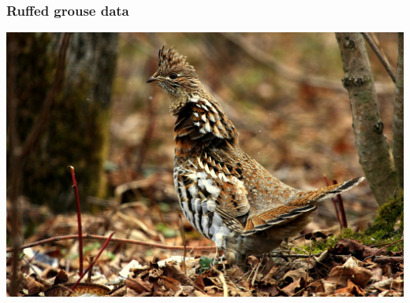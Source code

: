 \documentclass[color=usenames,dvipsnames]{beamer}\usepackage[]{graphicx}\usepackage[]{xcolor}
\begin{document}






\begin{frame}
  \frametitle{Ruffed grouse data}
  \centering
  \includegraphics[width=\textwidth]{figs/RUGR}
\end{frame}
\end{document}
